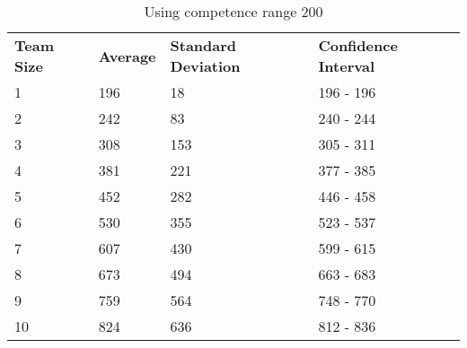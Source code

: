 \documentclass[12pt]{article}
\begin{document}
\begin{table}[!htb]
	\centering
	\caption{Using competence range 200}
	\begin{tabular}{llll}
		\textbf{Team Size} & \textbf{Average} & \textbf{Standard Deviation} & \textbf{Confidence Interval} \\
		1                  & 196              & 18                          & 196 - 196                    \\
		2                  & 242              & 83                          & 240 - 244                    \\
		3                  & 308              & 153                         & 305 - 311                    \\
		4                  & 381              & 221                         & 377 - 385                    \\
		5                  & 452              & 282                         & 446 - 458                    \\
		6                  & 530              & 355                         & 523 - 537                    \\
		7                  & 607              & 430                         & 599 - 615                    \\
		8                  & 673              & 494                         & 663 - 683                    \\
		9                  & 759              & 564                         & 748 - 770                    \\
		10                 & 824              & 636                         & 812 - 836                   
	\end{tabular}
\end{table}
\end{document}
